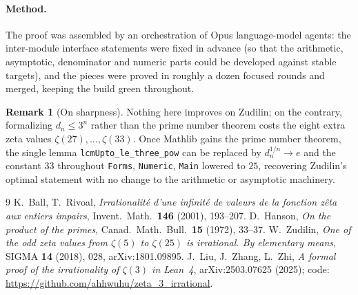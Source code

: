 \documentclass[11pt]{article}
\theoremstyle{definition}
\newtheorem{remark}[theorem]{Remark}
\newcommand{\code}[1]{\texttt{#1}}
\begin{document}
\paragraph{Method.} The proof was assembled by an orchestration of Opus
language-model agents: the inter-module interface statements were fixed in
advance (so that the arithmetic, asymptotic, denominator and numeric parts
could be developed against stable targets), and the pieces were proved in
roughly a dozen focused rounds and merged, keeping the build green throughout.

\begin{remark}[On sharpness]
Nothing here improves on Zudilin; on the contrary, formalizing $d_n\le3^n$
rather than the prime number theorem costs the eight extra zeta values
$\zeta(27),\dots,\zeta(33)$. Once Mathlib gains the prime number theorem, the
single lemma \code{lcmUpto\_le\_three\_pow} can be replaced by
$d_n^{1/n}\to e$ and the constant $33$ throughout \code{Forms}, \code{Numeric},
\code{Main} lowered to $25$, recovering Zudilin's optimal statement with no
change to the arithmetic or asymptotic machinery.
\end{remark}

\begin{thebibliography}{9}
  K.~Ball, T.~Rivoal,
  \emph{Irrationalit\'e d'une infinit\'e de valeurs de la fonction z\^eta aux
  entiers impairs},
  Invent.\ Math.\ \textbf{146} (2001), 193--207.
  D.~Hanson,
  \emph{On the product of the primes},
  Canad.\ Math.\ Bull.\ \textbf{15} (1972), 33--37.
  W.~Zudilin,
  \emph{One of the odd zeta values from $\zeta(5)$ to $\zeta(25)$ is
  irrational. By elementary means},
  SIGMA \textbf{14} (2018), 028, arXiv:1801.09895.
  J.~Liu, J.~Zhang, L.~Zhi,
  \emph{A formal proof of the irrationality of $\zeta(3)$ in Lean~4},
  arXiv:2503.07625 (2025);
  code: \url{https://github.com/ahhwuhu/zeta_3_irrational}.
\end{thebibliography}
\end{document}
